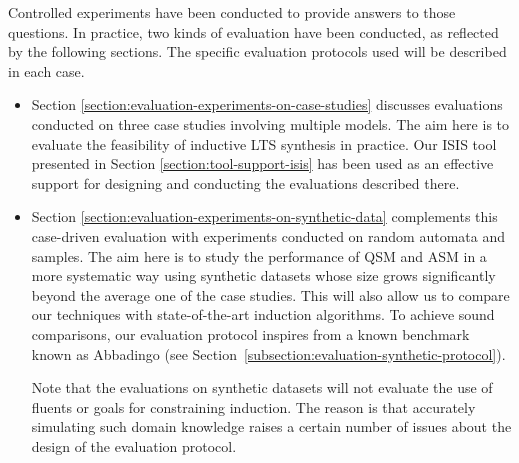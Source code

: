 Controlled experiments have been conducted to provide answers to those questions. In practice, two kinds of evaluation have been conducted, as reflected by the following sections. The specific evaluation protocols used will be described in each case.
\begin{itemize}

\item Section \ref{section:evaluation-experiments-on-case-studies} discusses evaluations conducted on three case studies involving multiple models. The aim here is to evaluate the feasibility of inductive LTS synthesis in practice. Our ISIS tool presented in Section \ref{section:tool-support-isis} has been used as an effective support for designing and conducting the evaluations described there.

\item Section \ref{section:evaluation-experiments-on-synthetic-data} complements this case-driven evaluation with experiments conducted on random automata and samples. The aim here is to study the performance of QSM and ASM in a more systematic way using synthetic datasets whose size grows significantly beyond the average one of the case studies. This will also allow us to compare our techniques with state-of-the-art induction algorithms. To achieve sound comparisons, our evaluation protocol inspires from a known benchmark known as Abbadingo \cite{Lang:1998} (see Section~\ref{subsection:evaluation-synthetic-protocol}).

Note that the evaluations on synthetic datasets will not evaluate the use of fluents or goals for constraining induction. The reason is that accurately simulating such domain knowledge raises a certain number of issues about the design of the evaluation protocol.
\end{itemize}


